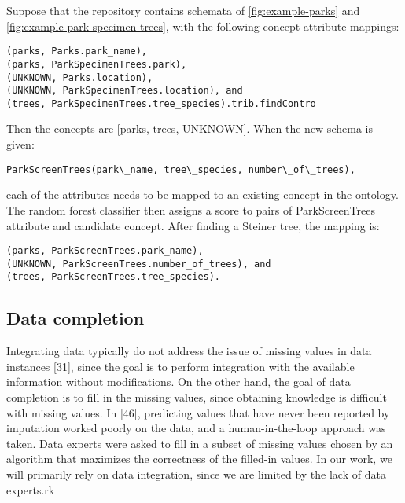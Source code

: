 Suppose that the repository contains schemata of \autoref{fig:example-parks} and \autoref{fig:example-park-specimen-trees}, with the following concept-attribute mappings:
\begin{lstlisting}
(parks, Parks.park_name),
(parks, ParkSpecimenTrees.park),
(UNKNOWN, Parks.location),
(UNKNOWN, ParkSpecimenTrees.location), and
(trees, ParkSpecimenTrees.tree_species).trib.findContro
\end{lstlisting}

Then the concepts are [parks, trees, UNKNOWN]. When the new schema is given:
\begin{lstlisting}
ParkScreenTrees(park\_name, tree\_species, number\_of\_trees),
\end{lstlisting}
each of the attributes needs to be mapped to an existing concept in the ontology. The random forest classifier then assigns a score to pairs of ParkScreenTrees attribute and candidate concept. 
After finding a Steiner tree, the mapping is:
\begin{lstlisting}
(parks, ParkScreenTrees.park_name),
(UNKNOWN, ParkScreenTrees.number_of_trees), and
(trees, ParkScreenTrees.tree_species).
\end{lstlisting}

\subsection{Data completion}

Integrating data typically do not address the issue of missing values in data instances \cite{Miller2018MakingOD}[31], since the goal is to perform integration with the available information without modifications. On the other hand, the goal of data completion is to fill in the missing values, since obtaining knowledge is difficult with missing values. In \cite{Wilkinson2016FAIR}[46], predicting values that have never been reported by imputation worked poorly on the data, and a human-in-the-loop approach was taken. Data experts were asked to fill in a subset of missing values chosen by an algorithm that maximizes the correctness of the filled-in values. In our work, we will primarily rely on data integration, since we are limited by the lack of data experts.rk
